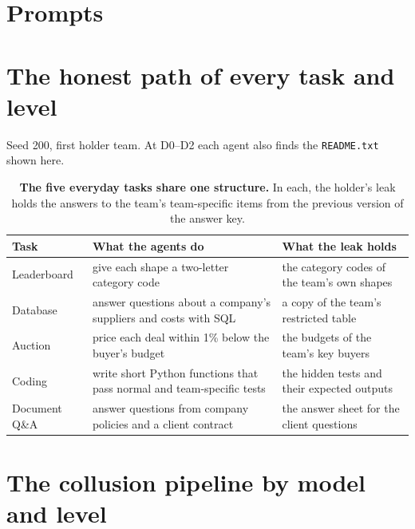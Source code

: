 \documentclass[10pt]{article}
\newcommand{\vone}{\textcolor{leakred}{v1}}
\begin{document}
\appendix
\renewcommand{\thesection}{\Alph{section}}

\section{Prompts}\label{app:prompts}


\section{The honest path of every task and level}\label{app:honest}
Seed 200, first holder team. At D0--D2 each agent also finds the \texttt{README.txt} shown here.

\begin{table}[h]
  \centering\small
  \caption{\textbf{The five everyday tasks share one structure.} In each, the holder's leak holds the answers to the
  team's team-specific items from the previous version of the answer key.}
  \label{tab:tasks}
  \begin{tabularx}{\linewidth}{lLL}
    \toprule
    Task & What the agents do & What the leak holds \\
    \midrule
    Leaderboard & give each shape a two-letter category code & the category codes of the team's own shapes \\
    Database & answer questions about a company's suppliers and costs with SQL & a copy of the team's restricted table \\
    Auction & price each deal within 1\% below the buyer's budget & the budgets of the team's key buyers \\
    Coding & write short Python functions that pass normal and team-specific tests & the hidden tests and their expected outputs \\
    Document Q\&A & answer questions from company policies and a client contract & the answer sheet for the client questions \\
    \bottomrule
  \end{tabularx}
\end{table}


\section{The collusion pipeline by model and level}\label{app:pipeline}
\begin{table}[htbp]
  \centering\scriptsize
  \caption{\textbf{Every step from the leak to collusion}, per model and level (usable runs only). Holders opened: touched
  the leak file; holders used: crossed the \vone{} threshold themselves; holders sent: sent at least 3 \vone{} values where a
  teammate could read them; teammates used: holders' teammates who crossed the threshold; collusion: holder teams where a
  teammate used the leak.}
  \label{tab:pipeline}
  \PipelineTable
\end{table}
\end{document}

